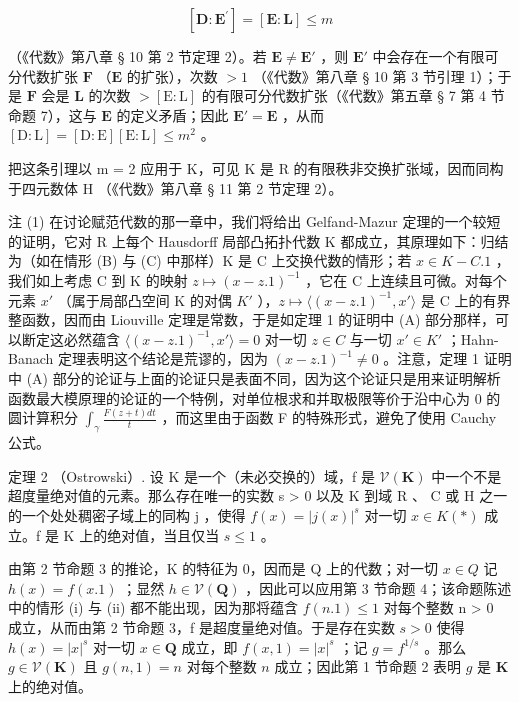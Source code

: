 \[
[ \mathbf {D} \colon \mathbf {E} ^ {\prime} ] = [ \mathbf {E} \colon \mathbf {L} ] \leqslant m
\]

（《代数》第八章 § 10 第 2 节定理 2）。若 \(\mathbf{E} \neq \mathbf{E}'\) ，则 \(\mathbf{E}'\) 中会存在一个有限可分代数扩张 \(\mathbf{F}\) （\(\mathbf{E}\) 的扩张），次数 \(>1\) （《代数》第八章 § 10 第 3 节引理 1）；于是 \(\mathbf{F}\) 会是 \(\mathbf{L}\) 的次数 \(>[\mathrm{E:L}]\) 的有限可分代数扩张（《代数》第五章 § 7 第 4 节命题 7），这与 \(\mathbf{E}\) 的定义矛盾；因此 \(\mathbf{E}' = \mathbf{E}\) ，从而 \([\mathrm{D:L}] = [\mathrm{D:E}][\mathrm{E:L}] \leqslant m^2\) 。

把这条引理以 m = 2 应用于 K，可见 K 是 R 的有限秩非交换扩张域，因而同构于四元数体 H （《代数》第八章 § 11 第 2 节定理 2）。

注 (1) 在讨论赋范代数的那一章中，我们将给出 Gelfand-Mazur 定理的一个较短的证明，它对 R 上每个 Hausdorff 局部凸拓扑代数 K 都成立，其原理如下：归结为（如在情形 (B) 与 (C) 中那样）K 是 C 上交换代数的情形；若 \(x \in K - C.1\) ，我们如上考虑 C 到 K 的映射 \(z \mapsto (x - z.1)^{-1}\) ，它在 C 上连续且可微。对每个元素 \(x'\) （属于局部凸空间 K 的对偶 \(K'\) ），\(z \mapsto \langle(x - z.1)^{-1}, x' \rangle\) 是 C 上的有界整函数，因而由 Liouville 定理是常数，于是如定理 1 的证明中 (A) 部分那样，可以断定这必然蕴含 \(\langle(x - z.1)^{-1}, x' \rangle = 0\) 对一切 \(z \in C\) 与一切 \(x' \in K'\) ；Hahn-Banach 定理表明这个结论是荒谬的，因为 \((x - z.1)^{-1} \neq 0\) 。注意，定理 1 证明中 (A) 部分的论证与上面的论证只是表面不同，因为这个论证只是用来证明解析函数最大模原理的论证的一个特例，对单位根求和并取极限等价于沿中心为 0 的圆计算积分 \(\int_{\gamma} \frac{F(z + t) dt}{t}\) ，而这里由于函数 F 的特殊形式，避免了使用 Cauchy 公式。

定理 2 （Ostrowski）. 设 K 是一个（未必交换的）域，f 是 \(\mathcal{V}(\mathbf{K})\) 中一个不是超度量绝对值的元素。那么存在唯一的实数 s > 0 以及 K 到域 R 、 C 或 H 之一的一个处处稠密子域上的同构 j ，使得 \(f(x) = |j(x)|^{s}\) 对一切 \(x \in K (*)\) 成立。f 是 K 上的绝对值，当且仅当 \(s \leqslant 1\) 。

由第 2 节命题 3 的推论，K 的特征为 0，因而是 Q 上的代数；对一切 \(x \in Q\) 记 \(h(x) = f(x.1)\) ；显然 \(h \in \mathcal{V}(\mathbf{Q})\) ，因此可以应用第 3 节命题 4；该命题陈述中的情形 (i) 与 (ii) 都不能出现，因为那将蕴含 \(f(n.1) \leqslant 1\) 对每个整数 n > 0 成立，从而由第 2 节命题 3，f 是超度量绝对值。于是存在实数 \(s > 0\) 使得 \(h(x) = |x|^s\) 对一切 \(x \in \mathbf{Q}\) 成立，即 \(f(x,1) = |x|^s\) ；记 \(g = f^{1 / s}\) 。那么 \(g \in \mathcal{V}(\mathbf{K})\) 且 \(g(n,1) = n\) 对每个整数 \(n\) 成立；因此第 1 节命题 2 表明 \(g\) 是 \(\mathbf{K}\) 上的绝对值。

